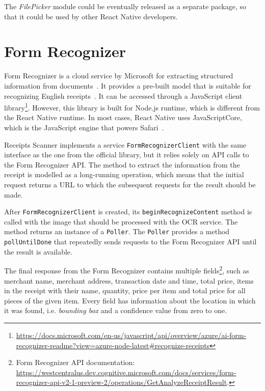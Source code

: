 \documentclass[
  digital, %
  table,   %
  oneside, %
  lof,     %
  lot,     %
]{fithesis3}
\newcommand{\definition}[1]{{#1}}
\begin{document}
The \textit{FilePicker} module could be eventually released as a separate package, so that it could be used by other React Native developers.

\section{Form Recognizer}
\label{sec:form_recognizer}
\definition{Form} Recognizer is a cloud service by Microsoft for extracting structured information from documents~\cite{WhatIsFormRecognizer}. It provides a pre-built model that is suitable for recognizing English receipts~\cite{FormRecognizerPrebuiltReceiptModel}. It can be accessed through a JavaScript client library\footnote{\url{https://docs.microsoft.com/en-us/javascript/api/overview/azure/ai-form-recognizer-readme?view=azure-node-latest\#recognize-receipts}}. However, this library is built for Node.js runtime, which is different from the React Native runtime. In most cases, React Native uses JavaScriptCore, which is the JavaScript engine that powers Safari~\cite{JavaScriptRNEnvironment}.

Receipts Scanner implements a service \texttt{FormRecognizerClient} with the same interface as the one from the official library, but it relies solely on API calls to the Form Recognizer API. The method to extract the information from the receipt is modelled as a long-running operation, which means that the initial request returns a URL to which the subsequent requests for the result should be made.

After \texttt{FormRecognizerClient} is created, its \texttt{beginRecognizeContent} method is called with the image that should be processed with the OCR service. The method returns an instance of a \texttt{Poller}. The \texttt{Poller} provides a method \texttt{pollUntilDone} that repeatedly sends requests to the Form Recognizer API until the result is available.

The final response from the Form Recognizer contains multiple fields\footnote{Form Recognizer API documentation:\\\url{https://westcentralus.dev.cognitive.microsoft.com/docs/services/form-recognizer-api-v2-1-preview-2/operations/GetAnalyzeReceiptResult}.}, such as merchant name, merchant address, transaction date and time, total price, items in the receipt with their name, quantity, price per item and total price for all pieces of the given item. Every field has information about the location in which it was found, i.e. \textit{bounding box} and a confidence value from zero to one.
\end{document}
